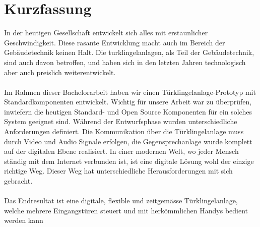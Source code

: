 \section*{Kurzfassung}
\label{sec:zusammenfassung}

In der heutigen Gesellschaft entwickelt sich alles mit erstaunlicher Geschwindigkeit. Diese rasante Entwicklung macht auch im Bereich der Gebäudetechnik keinen Halt. Die \gls{turklingelanlage}n, als Teil der Gebäudetechnik, sind auch davon betroffen, und haben sich in den letzten Jahren technologisch aber auch preislich weiterentwickelt. 
\\
\\
Im Rahmen dieser Bachelorarbeit haben wir einen Türklingelanlage-Prototyp mit Standardkomponenten entwickelt. Wichtig für unsere Arbeit war zu überprüfen, inwiefern die heutigen Standard- und Open Source Komponenten für ein solches System geeignet sind. Während der Entwurfsphase wurden unterschiedliche Anforderungen definiert. Die Kommunikation über die Türklingelanlage muss durch Video und Audio Signale erfolgen, die Gegensprechanlage wurde komplett auf der digitalen Ebene realisiert. In einer modernen Welt, wo jeder Mensch ständig mit dem Internet verbunden ist, ist eine digitale Lösung wohl der einzige richtige Weg. Dieser Weg hat unterschiedliche Herausforderungen mit sich gebracht. 
\\
\\
Das Endresultat ist eine digitale, flexible und zeitgemässe Türklingelanlage, welche mehrere Eingangstüren steuert und mit herkömmlichen Handys bedient werden kann